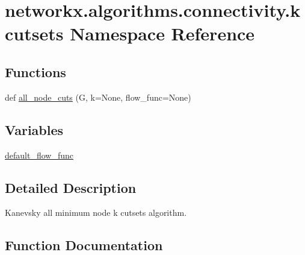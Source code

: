 \hypertarget{namespacenetworkx_1_1algorithms_1_1connectivity_1_1kcutsets}{}\section{networkx.\+algorithms.\+connectivity.\+kcutsets Namespace Reference}
\label{namespacenetworkx_1_1algorithms_1_1connectivity_1_1kcutsets}
\subsection*{Functions}
\begin{DoxyCompactItemize}
\item 
def \hyperlink{namespacenetworkx_1_1algorithms_1_1connectivity_1_1kcutsets_a407762b03a889cec68241adebb8e839f}{all\+\_\+node\+\_\+cuts} (G, k=None, flow\+\_\+func=None)
\end{DoxyCompactItemize}
\subsection*{Variables}
\begin{DoxyCompactItemize}
\item 
\hyperlink{namespacenetworkx_1_1algorithms_1_1connectivity_1_1kcutsets_a28918a3635d257af05dd82db0644e4c4}{default\+\_\+flow\+\_\+func}
\end{DoxyCompactItemize}


\subsection{Detailed Description}
\begin{DoxyVerb}Kanevsky all minimum node k cutsets algorithm.
\end{DoxyVerb}
 

\subsection{Function Documentation}
\mbox{\label{namespacenetworkx_1_1algorithms_1_1connectivity_1_1kcutsets_a407762b03a889cec68241adebb8e839f}} 

